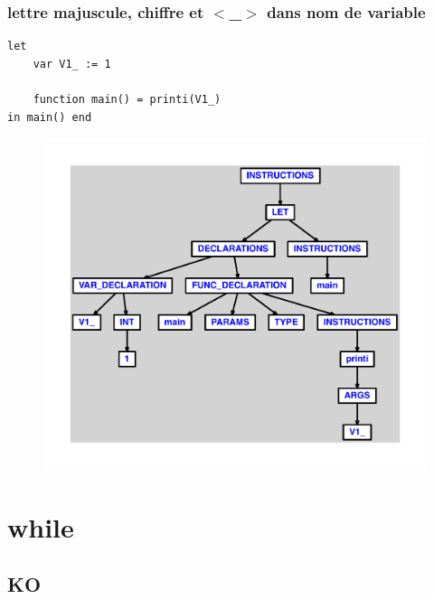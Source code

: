 \documentclass{article}
\begin{document}
\subsubsection{lettre majuscule, chiffre et $ < $\_$ > $ dans nom de variable}
\begin{lstlisting}
let
	var V1_ := 1

	function main() = printi(V1_)
in main() end
\end{lstlisting}
\newpage
\begin{figure}[H]
\centering
\includegraphics[max width=\textwidth]{ast/ast_322.pdf}
\end{figure}
\newpage
\section{while}
\subsection{KO}
\end{document}
